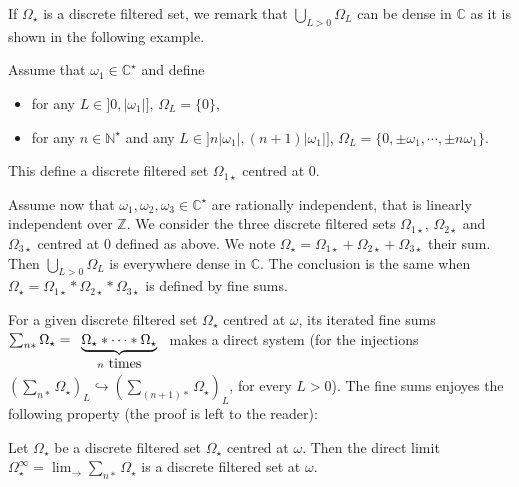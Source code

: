 \documentclass[11pt, english]{smfart}
\theoremstyle{definition}
\begin{document}
If $\Omega_\star$ is a discrete filtered set, we remark that
$\bigcup_{L>0} \Omega_L$ can be dense in $\mathbb{C}$ as it is shown
in the following example.

\begin{exem}
Assume that $\omega_1 \in \mathbb{C}^\star$ and define
\begin{itemize}
\item for any $L \in ]0, |\omega_1|]$, $\Omega_L = \{0\}$,
\item for any $n \in \mathbb{N}^\star$ and any $L \in
  ]n|\omega_1|, (n+1)|\omega_1|]$, $\Omega_L = \{0, \pm \omega_1, \cdots,
  \pm n \omega_1\}$.
\end{itemize}
This define a discrete filtered set $\Omega_{1\star}$ centred at $0$.

Assume now that $\omega_1, \omega_2, \omega_3 \in \mathbb{C}^\star$
are rationally independent, that is linearly independent over
$\mathbb{Z}$. We consider  the
three discrete filtered sets $\Omega_{1\star}$,  $\Omega_{2\star}$
and $\Omega_{3\star}$ centred at $0$ defined as above. We note
$\Omega_\star = \Omega_{1\star} + \Omega_{2\star}+ \Omega_{3\star}$ their
sum. Then $\bigcup_{L>0} \Omega_L$ is everywhere dense   in
$\mathbb{C}$. The conclusion is the same when $\Omega_\star =
\Omega_{1\star} \ast \Omega_{2\star} \ast \Omega_{3\star}$ is
defined by fine sums.
\end{exem}

For a given discrete filtered set $\Omega_\star$ centred at
$\omega$, its iterated fine sums ${\sum_{n \ast} \Omega_\star =

\begin{array}[t]{c}
\displaystyle \underbrace{\Omega_\star \ast \cdots \ast \Omega_\star}\\
{\scriptstyle n \mbox{ times}}
\end{array}
}$ makes a direct system (for the
injections \linebreak ${\left(\sum_{n \ast} \Omega_\star\right)_L \hookrightarrow
\left(\sum_{(n+1) \ast} \Omega_\star\right)_L}$, for every $L>0$). The
fine sums enjoyes the following property (the proof is left to the reader):

\begin{prop}
Let $\Omega_\star$ be a discrete filtered set $\Omega_\star$ centred at
$\omega$. Then the direct limit $\Omega_\star^\infty = 
\displaystyle\lim_{\rightarrow}\sum_{n \ast}
\Omega_\star$ is a discrete filtered set at
$\omega$.
\end{prop}
\end{document}
